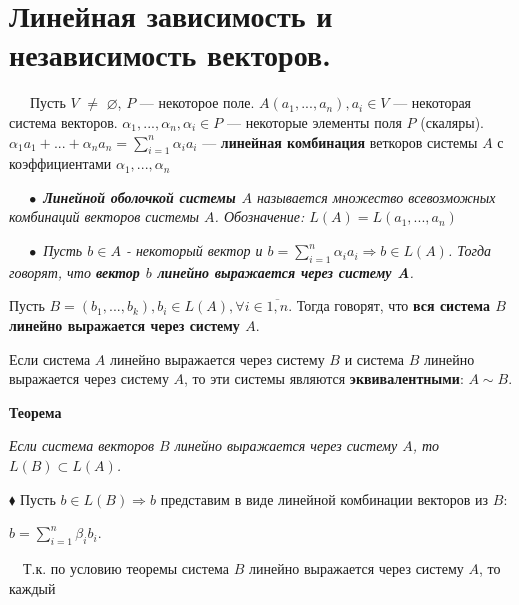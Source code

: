 \documentclass[a4paper, 12pt]{report}
\begin{document}
	
	
	
	
	
	
	
	
	
	
	
	
	
	
	
	
	
	
	\section{Линейная зависимость и независимость векторов.}
	$\quad \; \ $Пусть $V$ $\ne$ $\varnothing$, $P$ --- некоторое поле. $A(a_1, ..., a_n), a_i \in V$ --- некоторая система векторов. $\alpha_1, ..., \alpha_n, \alpha_i \in P$ --- некоторые элементы поля $P$ (скаляры).
	$\alpha_1a_1 + ... + \alpha_n a_n = \sum\limits_{i=1}^n \alpha_i a_i$ --- \textbf{линейная комбинация} веткоров системы $A$ с коэффициентами $\alpha_1, ..., \alpha_n$
	\par\bigskip
	$\quad\; \bullet$ \textit{\textbf{Линейной оболочкой системы $A$} называется множество всевозможных комбинаций векторов системы $A$. Обозначение: $L(A) = L(a_1, ..., a_n)$}
	\par\bigskip
	$\quad\; \bullet$ \textit{Пусть $b \in A$ - некоторый вектор и $b = \sum\limits_{i=1}^n \alpha_i a_i \Rightarrow b \in L(A)$. Тогда говорят, что \textbf{вектор $b$ линейно выражается через систему A}.}
	\par\bigskip
	Пусть $B = (b_1, ..., b_k), b_i \in L(A), \forall i \in \overline{1,n}$. Тогда говорят, что \textbf{вся система $B$ линейно выражается через систему $A$}.
	\par\bigskip
	Если система $A$ линейно выражается через систему $B$ и система $B$ линейно выражается через систему $A$, то эти системы являются \textbf{эквивалентными}: $A \sim B$.
	\par\bigskip
	\textbf{Теорема}
	
	\textit{Если система векторов $B$ линейно выражается через систему $A$, то $L(B) \subset L(A)$.}
	\par\bigskip
	$\blacklozenge$ Пусть $b \in L(B) \Rightarrow b$ представим в виде линейной комбинации векторов из $B$: 
	\begin{center}$b = \sum\limits_{i=1}^n \beta_i b_i$.\end{center}
	
	$\quad$Т.к. по условию теоремы система $B$ линейно выражается через систему $A$, то каждый 
	
\end{document}
